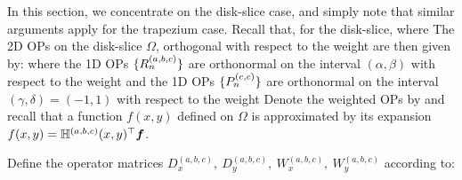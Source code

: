 In this section, we concentrate on the disk-slice case, and simply note that similar arguments apply for the trapezium case. Recall that, for the disk-slice,
where
The 2D OPs on the disk-slice $\Omega$, orthogonal with respect to the weight
are then given by:
where the 1D OPs $\{R^{(a, b, c)}_n\}$ are orthonormal on the interval $(\alpha, \beta)$ with respect to the weight
and the 1D OPs $\{{P}^{(c, c)}_n\}$ are orthonormal on the interval $(\gamma, \delta) = (-1, 1)$ with respect to the weight
Denote the weighted OPs by 
and recall that a function $f(x,y)$ defined on $\Omega$ is approximated by its expansion $f(x,y) = \mathbb{H}^{(a,b,c)}(x,y)^\top \bm{f}$. 

\begin{definition}\label{def:ds:differentialoperators}
	Define the operator matrices $D_x^{(a,b,c)}, \: D_y^{(a,b,c)}, \: W_x^{(a,b,c)}, \: W_y^{(a,b,c)}$ according to:
\end{definition}

